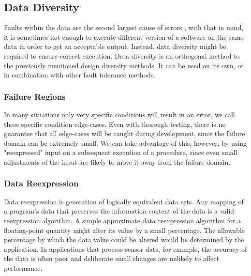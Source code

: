 \subsection{Data Diversity}

Faults within the data are the second largest cause of errors \cite{nasa:stats}, with that in mind, it is sometimes not enough to execute different version of a software on the same data in order to get an acceptable output. Instead, data diversity might be required to ensure correct execution. Data diversity is an orthogonal method to the previously mentioned design diversity methods. It can be used on its own, or in combination with other fault tolerance methods.

\subsubsection{Failure Regions}

In many situations only very specific conditions will result in an error, we call these specific condition edge-cases. Even with thorough testing, there is no guarantee that all edge-cases will be caught during development, since the failure domain can be extremely small. We can take advantage of this, however, by using "reexpressed" input on a subsequent execution of a procedure, since even small adjustments of the input are likely to move it away from the failure domain. 

\subsubsection{Data Reexpression}

Data reexpression is generation of logically equivalent data sets. Any mapping of a program's data that preserves the information content of the data is a valid reexpression algorithm. A simple approximate data reexpression algorithm for a floating-point quantity might alter its value by a small percentage. The allowable percentage by which the data value could be altered would be determined by the application. In applications that process sensor data, for example, the accuracy of the data is often poor and deliberate small changes are unlikely to affect performance. \cite{nasa:datadiversity}

